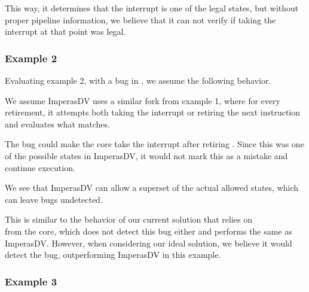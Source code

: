 This way, it determines that the interrupt is one of the legal states, but without proper pipeline information, we believe that it can not verify if taking the interrupt at that point was legal.

\subsubsection{Example 2}

Evaluating example 2, with a bug in , we assume the following behavior. 

We assume ImperasDV uses a similar fork from example 1, where for every retirement, it attempts both taking the interrupt or retiring the next instruction and evaluates what matches. 

The bug could make the core take the interrupt after retiring . Since this was one of the possible states in ImperasDV, it would not mark this as a mistake and continue execution.

We see that ImperasDV can allow a superset of the actual allowed states, which can leave bugs undetected.

This is similar to the behavior of our current solution that relies on \\ from the core, which does not detect this bug either and performs the same as ImperasDV. 
However, when considering our ideal solution, we believe it would detect the bug, outperforming ImperasDV in this example.




\subsubsection{Example 3}

